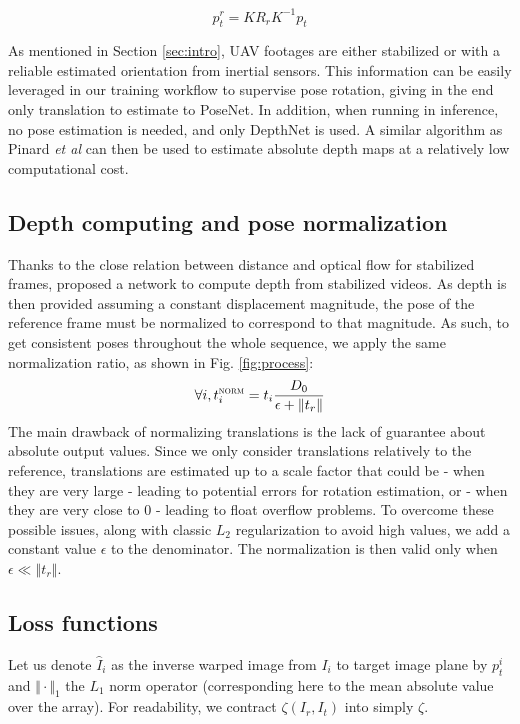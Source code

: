 \documentclass[runningheads]{llncs}
\def\etal{\emph{et al}\:}
\begin{document}
\begin{equation}
\label{eq:stab}
p^r_t=KR_rK^{-1}p_t
\end{equation}

As mentioned in Section \ref{sec:intro}, UAV footages are either stabilized or with a reliable estimated orientation from inertial sensors. This information can be easily leveraged in our training workflow to supervise pose rotation, giving in the end only translation to estimate to PoseNet. In addition, when running in inference, no pose estimation is needed, and only DepthNet is used. A similar algorithm as Pinard \etal \cite{pinard:hal-01587658} can then be used to estimate absolute depth maps at a relatively low computational cost.

\subsection{Depth computing and pose normalization}
Thanks to the close relation between distance and optical flow for stabilized frames, \cite{isprs-annals-IV-2-W3-67-2017} proposed a network to compute depth from stabilized videos.
As depth is then provided assuming a constant displacement magnitude, the pose of the reference frame must be normalized to correspond to that magnitude.
As such, to get consistent poses throughout the whole sequence, we apply the same normalization ratio, as shown in Fig. \ref{fig:process}:
\begin{equation}
\forall i, t_i^{\textsc{norm}} = t_i\frac{D_0}{\epsilon + \Vert t_r\Vert}
\end{equation}
The main drawback of normalizing translations is the lack of guarantee about absolute output values. Since we only consider translations relatively to the reference, translations are estimated up to a scale factor that could be - when they are very large - leading to potential errors for rotation estimation, or - when they are very close to $0$ - leading to float overflow problems. To overcome these possible issues, along with classic $L_2$ regularization to avoid high values, we add a constant value $\epsilon$ to the denominator. The normalization is then valid only when 
$\epsilon \ll \left\Vert t_r \right\Vert$.

\subsection{Loss functions}
 Let us denote $\widehat{I}_i$ as the inverse warped image from $I_i$ to target image plane by $p^i_t$ and $\Vert\cdot\Vert_1$ 
the $L_1$ norm operator (corresponding here to the mean absolute value over the array). 
For readability, we contract $\zeta(I_r, I_t)$ into simply $\zeta$.
 
\end{document}
